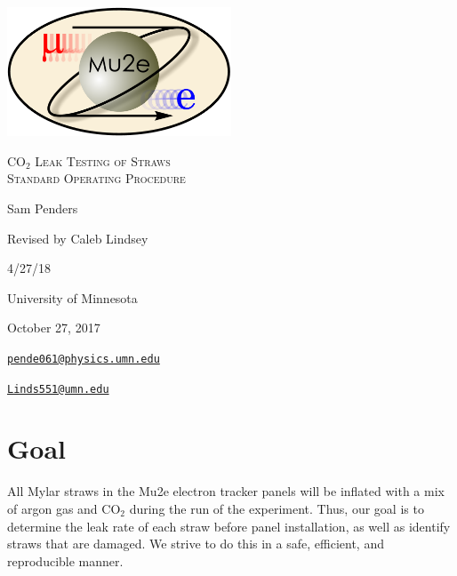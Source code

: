 \documentclass[A4,12pt]{article}
\begin{document}
\begin{titlepage}
	\centering
	\includegraphics[width=0.5\textwidth]{mu2e_logo_oval.png}\par\vspace{2cm}
	{\scshape\LARGE CO$_2$ Leak Testing of Straws \\
		Standard Operating Procedure\par}
	\vspace{3cm}
	{\Large Sam Penders\par}
    \vspace{.5cm}
    {\small Revised by Caleb Lindsey\par}
    {\small 4/27/18\par}
	\vspace{3cm}
	{\large University of Minnesota\par}
 	\vspace{.5cm}
	{\large October 27, 2017\par}
	\vfill
	{\href{mailto:pende061@physics.umn.edu}
    {\tt{pende061@physics.umn.edu}}\par}
	
    {\href{Linds551@umn.edu}
    {\tt{Linds551@umn.edu}}\par}
\end{titlepage}

\clearpage
\setcounter{page}{1}

\newenvironment{myitemize} %
{ \begin{itemize}
    \setlength{\itemsep}{4pt}
    \setlength{\parskip}{0pt}
    \setlength{\parsep}{0pt}     }
{ \end{itemize}                  } 

\section{Goal}
All Mylar straws in the Mu2e electron tracker panels will be inflated with a mix of argon gas and CO$_2$ during the run of the experiment. Thus, our goal is to determine the leak rate of each straw before panel installation, as well as identify straws that are damaged. We strive to do this in a safe, efficient, and reproducible manner.
\end{document}

